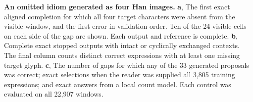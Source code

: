 \textbf{An omitted idiom generated as four Han images.}
\textbf{a}, The first exact aligned completion for which all four target
characters were absent from the visible window, and the first error in
validation order. Ten of the 24 visible cells on each side of the gap
are shown. Each output and reference is complete.
\textbf{b}, Complete exact stopped outputs with intact or cyclically
exchanged contexts. The final column counts distinct correct expressions
with at least one missing target glyph.
\textbf{c}, The number of gaps for which any of the 33 generated proposals
was correct; exact selections when the reader was supplied all 3,805
training expressions; and exact answers from a local count model. Each
control was evaluated on all 22,907 windows.

